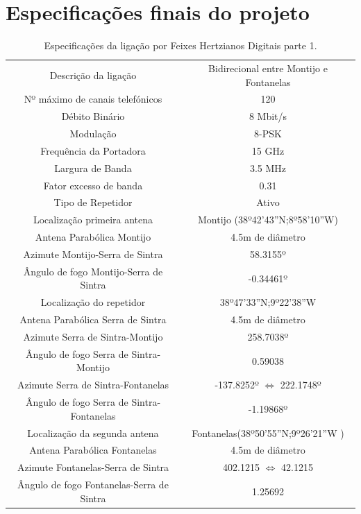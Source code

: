 \section{Especificações finais do projeto}
\begin{table}[H]
\centering
\begin{tabular}{|c|c|}
\hline
Descrição da ligação & Bidirecional entre Montijo e Fontanelas\\
Nº máximo de canais telefónicos & 120 \\
Débito Binário & 8 Mbit/s \\
Modulação & 8-PSK\\
Frequência da Portadora & 15 GHz\\
Largura de Banda & 3.5 MHz\\
Fator excesso de banda & 0.31\\
Tipo de Repetidor & Ativo\\
Localização primeira antena & Montijo (38º42'43''N;8º58'10''W)\\
Antena Parabólica Montijo & 4.5m de diâmetro\\
Azimute Montijo-Serra de Sintra & 58.3155º \\
Ângulo de fogo Montijo-Serra de Sintra & -0.34461º\\
Localização do repetidor & 38º47'33''N;9º22'38''W \\
Antena Parabólica Serra de Sintra & 4.5m de diâmetro\\
Azimute Serra de Sintra-Montijo & 258.7038º \\
Ângulo de fogo Serra de Sintra-Montijo & 0.59038\\
Azimute Serra de Sintra-Fontanelas & -137.8252º $\Leftrightarrow$ 222.1748º\\
Ângulo de fogo Serra de Sintra-Fontanelas & -1.19868º\\
Localização da segunda antena & Fontanelas(38º50'55''N;9º26'21''W )\\
Antena Parabólica Fontanelas & 4.5m de diâmetro\\
Azimute Fontanelas-Serra de Sintra & 402.1215 $\Leftrightarrow$ 42.1215\\
Ângulo de fogo Fontanelas-Serra de Sintra & 1.25692\\
\hline
\end{tabular}
\caption{Especificações da ligação por Feixes Hertzianos Digitais parte 1.}
\end{table}
